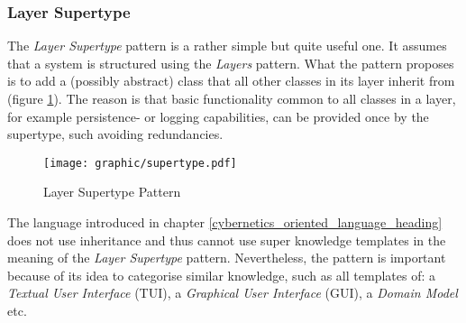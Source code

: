 %
%
%
%
%
%
%

\subsubsection{Layer Supertype}
\label{layer_supertype_heading}

The \emph{Layer Supertype} pattern \cite{fowler2002} is a rather simple but
quite useful one. It assumes that a system is structured using the
\emph{Layers} pattern. What the pattern proposes is to add a (possibly
abstract) class that all other classes in its layer inherit from (figure
\ref{supertype_figure}). The reason is that basic functionality common to all
classes in a layer, for example persistence- or logging capabilities, can be
provided once by the supertype, such avoiding redundancies.

\begin{figure}[ht]
    \begin{center}
        \texttt{[image: graphic/supertype.pdf]}
        \caption{Layer Supertype Pattern}
        \label{supertype_figure}
    \end{center}
\end{figure}

The language introduced in chapter \ref{cybernetics_oriented_language_heading}
does not use inheritance and thus cannot use super knowledge templates in the
meaning of the \emph{Layer Supertype} pattern. Nevertheless, the pattern is important
because of its idea to categorise similar knowledge, such as all templates of:
a \emph{Textual User Interface} (TUI), a \emph{Graphical User Interface} (GUI),
a \emph{Domain Model} etc.
